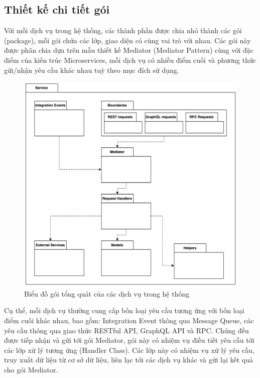 \documentclass[../DoAn.tex]{subfiles}
\begin{document}
\subsection{Thiết kế chi tiết gói}
\label{subsection:4.1.3}

Với mỗi dịch vụ trong hệ thống, các thành phần được chia nhỏ thành các gói (package), mỗi gói chứa các lớp, giao diện có cùng vai trò với nhau.
Các gói này được phân chia dựa trên mẫu thiết kế Mediator (Mediator Pattern) cùng với đặc điểm của kiến trúc Microservices, mỗi dịch vụ có nhiều
điểm cuối và phương thức gửi/nhận yêu cầu khác nhau tuỳ theo mục đích sử dụng.

\begin{figure}[H]
    \centering
    \includegraphics[width=1.0\linewidth]{Hinhve/Package_GeneralServicePackageDiagram.png}
    \caption{Biểu đồ gói tổng quát của các dịch vụ trong hệ thống}
    \label{fig:Package_GeneralServicePackageDiagram}
\end{figure}

Cụ thể, mỗi dịch vụ thường cung cấp bốn loại yêu cầu tương ứng với bốn loại điểm cuối khác nhau, bao gồm: Integration Event thông qua Message Queue,
các yêu cầu thông qua giao thức RESTful API, GraphQL API và RPC. Chúng đều được tiếp nhận và gửi tới gói Mediator, gói này có nhiệm vụ điều tiết yêu cầu
tới các lớp xử lý tương ứng (Handler Class). Các lớp này có nhiệm vụ xử lý yêu cầu, truy xuất dữ liệu từ cơ sở dữ liệu, liên lạc tới các dịch vụ khác và gửi lại kết quả cho gói Mediator.
\end{document}
